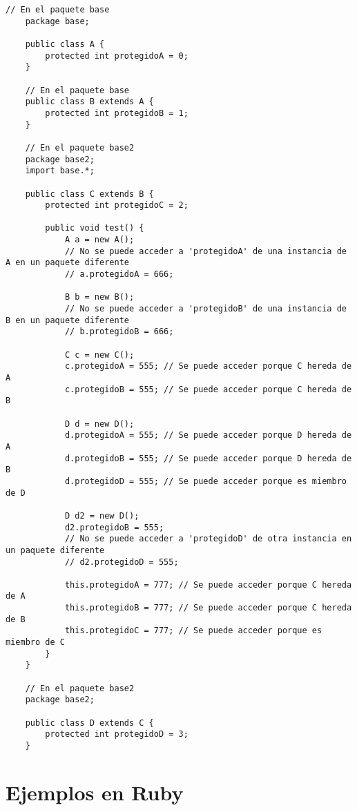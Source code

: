 \documentclass[a4paper,12pt]{article}
\begin{document}
\begin{lstlisting}[style=customjava]
    // En el paquete base
    package base;
    
    public class A {
        protected int protegidoA = 0;
    }
    
    // En el paquete base
    public class B extends A {
        protected int protegidoB = 1;
    }
    
    // En el paquete base2
    package base2;
    import base.*;
    
    public class C extends B {
        protected int protegidoC = 2;
    
        public void test() {
            A a = new A();
            // No se puede acceder a 'protegidoA' de una instancia de A en un paquete diferente
            // a.protegidoA = 666;
    
            B b = new B();
            // No se puede acceder a 'protegidoB' de una instancia de B en un paquete diferente
            // b.protegidoB = 666;
    
            C c = new C();
            c.protegidoA = 555; // Se puede acceder porque C hereda de A
            c.protegidoB = 555; // Se puede acceder porque C hereda de B
    
            D d = new D();
            d.protegidoA = 555; // Se puede acceder porque D hereda de A
            d.protegidoB = 555; // Se puede acceder porque D hereda de B
            d.protegidoD = 555; // Se puede acceder porque es miembro de D
    
            D d2 = new D();
            d2.protegidoB = 555;
            // No se puede acceder a 'protegidoD' de otra instancia en un paquete diferente
            // d2.protegidoD = 555;
    
            this.protegidoA = 777; // Se puede acceder porque C hereda de A
            this.protegidoB = 777; // Se puede acceder porque C hereda de B
            this.protegidoC = 777; // Se puede acceder porque es miembro de C
        }
    }
    
    // En el paquete base2
    package base2;
    
    public class D extends C {
        protected int protegidoD = 3;
    }
\end{lstlisting}


\section{Ejemplos en Ruby}
\end{document}
